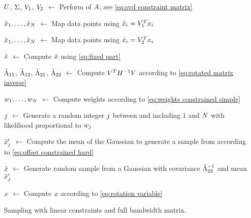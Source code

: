 \begin{algorithm}[t]
	
	$U$, $\Sigma$, $V_1$, $V_2$ $\gets$ Perform  of $A$; see \cref{eq:svd constraint matrix}
	
	$\bar{x}_{1},\ldots,\bar{x}_{N}$ $\gets$ Map data points using $\bar{x}_{i} = V_1^T x_{i}$
		
	$\tilde{x}_{1},\ldots,\tilde{x}_{N}$ $\gets$ Map data points using $\tilde{x}_{i} = V_2^T x_{i}$
	
	$\bar{x}$ $\gets$ Compute $\bar{x}$ using \cref{eq:fixed part}
	
	$\tilde{\Lambda}_{11}$, $\tilde{\Lambda}_{12}$, $\tilde{\Lambda}_{21}$, $\tilde{\Lambda}_{22}$ $\gets$ Compute $V^T H^{-1} V$ according to \cref{eq:rotated matrix inverse}
	
	$w_{1},\ldots,w_{N}$ $\gets$ Compute weights according to \cref{eq:weights constrained simple}
	
	$j$ $\gets$ Generate a random integer $j$ between and including $1$ and $N$ with likelihood proportional to $w_{j}$
	
	$\tilde{x}_{j}'$ $\gets$ Compute the mean of the Gaussian to generate a sample from according to \cref{eq:offset constrained hard}
	
	$\tilde{x}$ $\gets$ Generate random sample from a Gaussian with covariance $\tilde{\Lambda}_{22}^{-1}$ and mean $\tilde{x}_{j}'$
	
	$x$ $\gets$ Compute $x$ according to \cref{eq:rotation variable}
		
	\caption{Sampling with linear constraints and full bandwidth matrix.}
	\label{alg:constrained hard}
\end{algorithm}

